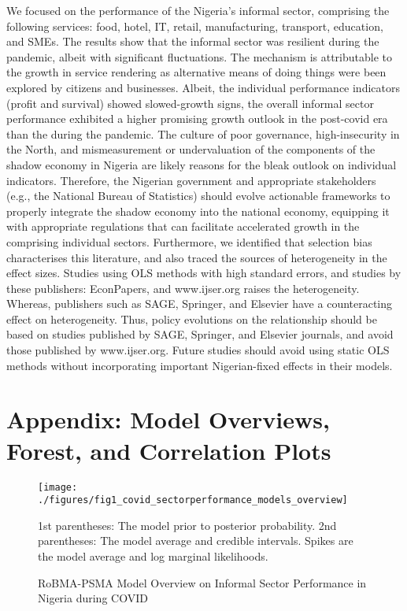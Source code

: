 \documentclass[a4paper, 12pt]{article}
\begin{document}
    We focused on the performance of the Nigeria's informal sector, comprising the following services: food, hotel, IT, retail, manufacturing, transport, education, and SMEs. The results show that the informal sector was resilient during the pandemic, albeit with significant fluctuations. The mechanism is attributable to the growth in service rendering as alternative means of doing things were been explored by citizens and businesses. Albeit, the individual performance indicators (profit and survival) showed slowed-growth signs, the overall informal sector performance exhibited a higher promising growth outlook in the post-covid era than the during the pandemic. The culture of poor governance, high-insecurity in the North, and mismeasurement or undervaluation of the components of the shadow economy in Nigeria are likely reasons for the bleak outlook on individual indicators. Therefore, the Nigerian government and appropriate stakeholders (e.g., the National Bureau of Statistics) should evolve actionable frameworks to properly integrate the shadow economy into the national economy, equipping it with appropriate regulations that can facilitate accelerated growth in the comprising individual sectors. Furthermore, we identified that selection bias characterises this literature, and also traced the sources of heterogeneity in the effect sizes. Studies using OLS methods with high standard errors, and studies by these publishers: EconPapers, and www.ijser.org raises the heterogeneity. Whereas, publishers such as SAGE, Springer, and Elsevier have a counteracting effect on heterogeneity. Thus, policy evolutions on the relationship should be based on studies published by SAGE, Springer, and Elsevier journals, and avoid those published by www.ijser.org. Future studies should avoid using static OLS methods without incorporating important Nigerian-fixed effects in their models.


    \section*{Appendix: Model Overviews, Forest, and Correlation Plots}\label{appendixA}

    \begin{figure}[H]
        \centering
        \texttt{[image: ./figures/fig1\_covid\_sectorperformance\_models\_overview]}
        \caption{RoBMA-PSMA Model Overview on Informal Sector Performance in Nigeria during COVID}
        \label{fig14:robma-psma-model-overview-covid}
        \begin{minipage}{10cm}
            \vspace{0.1cm}
            \small 1st parentheses: The model prior to posterior probability. 2nd parentheses: The model average and credible intervals. Spikes are the model average and log marginal likelihoods.
        \end{minipage}
    \end{figure}
\end{document}
